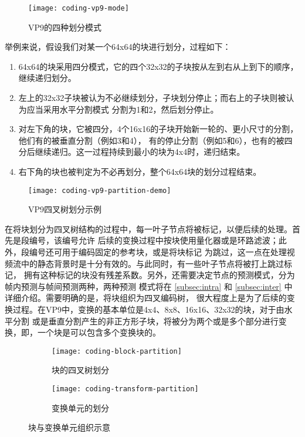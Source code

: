 \begin{figure}[H] %
  \centering
  \texttt{[image: coding-vp9-mode]}
  \caption{VP9的四种划分模式}
  \label{fig:coding-vp9-mode}
\end{figure}

举例来说，假设我们对某一个64x64的块进行划分，过程如下：
\begin{enumerate}
  \item 64x64的块采用四分模式，它的四个32x32的子块按从左到右从上到下的顺序，继续递归划分。
  \item 左上的32x32子块被认为不必继续划分，子块划分停止；而右上的子块则被认为应当采用水平分割模式
  分割为1和2，然后划分停止。
  \item 对左下角的块，它被四分，4个16x16的子块开始新一轮的、更小尺寸的分割，他们有的被垂直分割（例如3和4），
  有的停止分割（例如5和6），也有的被四分后继续递归。这一过程持续到最小的块为4x4时，递归结束。
  \item 右下角的块也被判定为不必再划分，整个64x64块的划分过程结束。
\end{enumerate}

\begin{figure}[H] %
  \centering
  \texttt{[image: coding-vp9-partition-demo]}
  \caption{VP9四叉树划分示例}
  \label{fig:coding-vp9-partition-demo}
\end{figure}

在将块划分为四叉树结构的过程中，每一叶子节点将被标记，以便后续的处理。首先是段编号，该编号允许
后续的变换过程中按块使用量化器或是环路滤波；此外，段编号还可用于编码固定的参考块，或是将块标记
为跳过，这一点在处理视频流中的静态背景时是十分有效的。与此同时，有一些叶子节点将被打上跳过标记，
拥有这种标记的块没有残差系数。另外，还需要决定节点的预测模式，分为帧内预测与帧间预测两种，两种预测
模式将在 \ref{subsec:intra} 和 \ref{subsec:inter} 中详细介绍。需要明确的是，将块组织为四叉编码树，
很大程度上是为了后续的变换过程。在VP9中，变换的基本单位是4x4、8x8、16x16、32x32的块，对于由水平分割
或是垂直分割产生的非正方形子块，将被分为两个或是多个部分进行变换，即，一个块是可以包含多个变换块的。

\begin{figure}[H]
  \centering%
  \begin{subfigure}{0.43\textwidth}
    \centering
    \texttt{[image: coding-block-partition]}
    \caption{块的四叉树划分}
  \end{subfigure}%
  \hspace{2em}%
  \begin{subfigure}{0.43\textwidth}
    \centering
    \texttt{[image: coding-transform-partition]}
    \caption{变换单元的划分}
  \end{subfigure}
  \caption{块与变换单元组织示意}
\end{figure}

